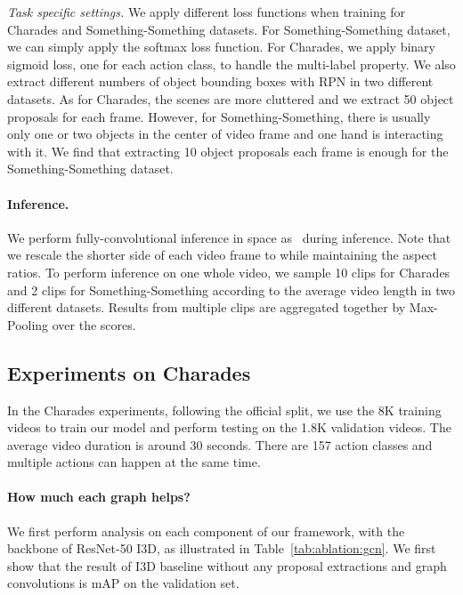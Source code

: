 \documentclass[runningheads]{llncs}
\begin{document}
\emph{Task specific settings.} We apply different loss functions when training for Charades and Something-Something datasets. For Something-Something dataset, we can simply apply the softmax loss function. For Charades, we apply binary sigmoid loss, one for each action class, to handle the multi-label property. We also extract different numbers of object bounding boxes with RPN in two different datasets. As for Charades, the scenes are more cluttered and we extract 50 object proposals for each frame. However, for Something-Something, there is usually only one or two objects in the center of video frame and one hand is interacting with it. We find that extracting 10 object proposals each frame is enough for the Something-Something dataset. 


\paragraph{Inference.} We perform fully-convolutional inference in space as~\cite{Simonyan2015,xiaolongwang2017nonlocal} during inference. Note that we rescale the shorter side of each video frame to  while maintaining the aspect ratios. To perform inference on one whole video, we sample 10 clips for Charades and 2 clips for Something-Something according to the average video length in two different datasets. Results from multiple clips are aggregated together by Max-Pooling over the scores. 



\vspace{-0.1in}
\subsection{Experiments on Charades}
\vspace{-0.05in}




In the Charades experiments, following the official split, we use the 8K training videos to train our model and perform testing on the 1.8K validation videos. The average video duration is around 30 seconds. There are 157 action classes and multiple actions can happen at the same time. 

\paragraph{How much each graph helps?} We first perform analysis on each component of our framework, with the backbone of ResNet-50 I3D, as illustrated in Table~\ref{tab:ablation:gcn}. We first show that the result of I3D baseline without any proposal extractions and graph convolutions is  mAP on the validation set. 
\end{document}
